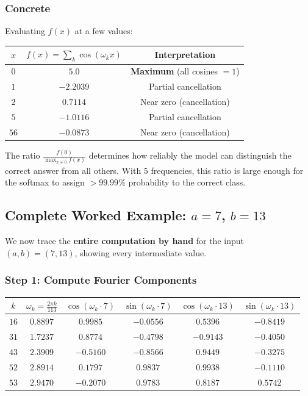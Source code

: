 \documentclass[11pt,a4paper]{article}
\begin{document}
\subsubsection*{Concrete}
Evaluating $f(x)$ at a few values:
\begin{center}
\begin{tabular}{|c|c|c|}
\hline
$x$ & $f(x) = \sum_k \cos(\omega_k x)$ & Interpretation \\ \hline
  $0$ & $5.0$ & \textbf{Maximum} (all cosines $= 1$) \\ \hline
  $1$ & $-2.2039$ & Partial cancellation \\ \hline
  $2$ & $0.7114$ & Near zero (cancellation) \\ \hline
  $5$ & $-1.0116$ & Partial cancellation \\ \hline
  $56$ & $-0.0873$ & Near zero (cancellation) \\ \hline
\end{tabular}
\end{center}

The ratio $\frac{f(0)}{\max_{x \neq 0} f(x)}$ determines how reliably the model can distinguish the correct answer from all others. With 5 frequencies, this ratio is large enough for the softmax to assign $> 99.99\%$ probability to the correct class.

\subsection{Complete Worked Example: $a=7$, $b=13$}

We now trace the \textbf{entire computation by hand} for the input $(a, b) = (7, 13)$, showing every intermediate value.

\subsubsection*{Step 1: Compute Fourier Components}
\begin{center}
\begin{tabular}{|c|c|c|c|c|c|}
\hline
$k$ & $\omega_k = \frac{2\pi k}{113}$ & $\cos(\omega_k \cdot 7)$ & $\sin(\omega_k \cdot 7)$ & $\cos(\omega_k \cdot 13)$ & $\sin(\omega_k \cdot 13)$ \\ \hline
  $16$ & $0.8897$ & $0.9985$ & $-0.0556$ & $0.5396$ & $-0.8419$ \\ \hline
  $31$ & $1.7237$ & $0.8774$ & $-0.4798$ & $-0.9143$ & $-0.4050$ \\ \hline
  $43$ & $2.3909$ & $-0.5160$ & $-0.8566$ & $0.9449$ & $-0.3275$ \\ \hline
  $52$ & $2.8914$ & $0.1797$ & $0.9837$ & $0.9938$ & $-0.1110$ \\ \hline
  $53$ & $2.9470$ & $-0.2070$ & $0.9783$ & $0.8187$ & $0.5742$ \\ \hline
\end{tabular}
\end{center}
\end{document}
